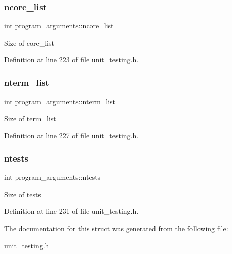 \subsubsection{\texorpdfstring{ncore\+\_\+list}{ncore\_list}}
{\footnotesize\ttfamily int program\+\_\+arguments\+::ncore\+\_\+list}

Size of {\ttfamily core\+\_\+list} 

Definition at line 223 of file unit\+\_\+testing.\+h.

\mbox{\label{structprogram__arguments_a48fbd16e4ce7ab5438078817c4931108}} 
\subsubsection{\texorpdfstring{nterm\+\_\+list}{nterm\_list}}
{\footnotesize\ttfamily int program\+\_\+arguments\+::nterm\+\_\+list}

Size of {\ttfamily term\+\_\+list} 

Definition at line 227 of file unit\+\_\+testing.\+h.

\mbox{\label{structprogram__arguments_a8b96bf14afced6bae0d45424ab2fac57}} 
\subsubsection{\texorpdfstring{ntests}{ntests}}
{\footnotesize\ttfamily int program\+\_\+arguments\+::ntests}

Size of {\ttfamily tests} 

Definition at line 231 of file unit\+\_\+testing.\+h.



The documentation for this struct was generated from the following file\+:\begin{DoxyCompactItemize}
\item 
\hyperlink{unit__testing_8h}{unit\+\_\+testing.\+h}\end{DoxyCompactItemize}
